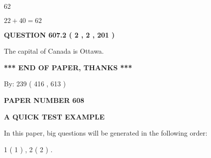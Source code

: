 \documentclass[12pt]{article}
\begin{document}
62
 
 
 
 
\noindent{}

$ %
22 +  %
40=   %
62$
 
 
  
\vspace{0.2in}
  
{\textbf{\Large{QUESTION
607.2 
 ( 2 , 2 , 201 )
}}}
  
  
 
 
\noindent{}
 
 
The capital of Canada is Ottawa.
 
 
 
 
   
   
 \vspace{0.2in}
 
   
   
   
   
\vspace{1.0in} 
{\textbf{\large{ *** END OF PAPER, THANKS *** }}} 
   
   
\hspace{1.0in} By: 
 239 ( 416 ,  613 )
   
   
   
   
\newpage 
\setcounter{page}{ 
   608001 } 
   
   
   
   
 {\textbf{ \Large{ PAPER NUMBER  608  }}}
   
   
\vspace{0.2in}
   
   
   
   
   
   
 \vspace{0.2in}
{\LARGE {\textbf{ A QUICK TEST EXAMPLE}}}
   
   
   
\vspace{0.2in}
   
In this paper, big questions will be generated in the following order: 
   
   
   1 ( 1 )
 ,
   2 ( 2 )
 .
  
\vspace{0.2in}
  
\end{document}
